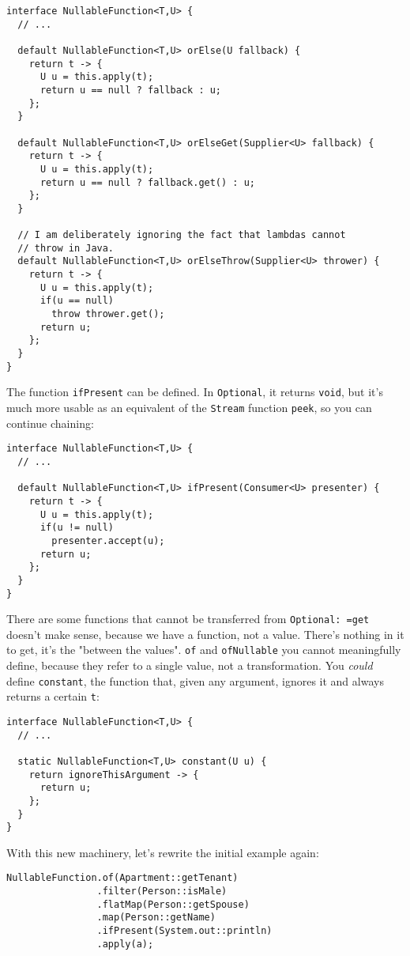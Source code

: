 \documentclass[11pt]{article}
\begin{document}
\begin{verbatim}
interface NullableFunction<T,U> {
  // ...

  default NullableFunction<T,U> orElse(U fallback) {
    return t -> {
      U u = this.apply(t);
      return u == null ? fallback : u;
    };
  }

  default NullableFunction<T,U> orElseGet(Supplier<U> fallback) {
    return t -> {
      U u = this.apply(t);
      return u == null ? fallback.get() : u;
    };
  }

  // I am deliberately ignoring the fact that lambdas cannot 
  // throw in Java.
  default NullableFunction<T,U> orElseThrow(Supplier<U> thrower) {
    return t -> {
      U u = this.apply(t);
      if(u == null)
        throw thrower.get();
      return u;
    };
  }
}
\end{verbatim}

The function \texttt{ifPresent} can be defined. In \texttt{Optional}, it returns \texttt{void}, but it's much more usable as an equivalent of the \texttt{Stream} function \texttt{peek}, so you can continue chaining:

\begin{verbatim}
interface NullableFunction<T,U> {
  // ...

  default NullableFunction<T,U> ifPresent(Consumer<U> presenter) {
    return t -> {
      U u = this.apply(t);
      if(u != null)
        presenter.accept(u);
      return u;
    };
  }
}
\end{verbatim}

There are some functions that cannot be transferred from \texttt{Optional: =get} doesn't make sense, because we have a function, not a value. There's nothing in it to get, it's the "between the values". \texttt{of} and \texttt{ofNullable} you cannot meaningfully define, because they refer to a single value, not a transformation. You \emph{could} define \texttt{constant}, the function that, given any argument, ignores it and always returns a certain \texttt{t}:

\begin{verbatim}
interface NullableFunction<T,U> {
  // ...

  static NullableFunction<T,U> constant(U u) {
    return ignoreThisArgument -> {
      return u;
    };
  }
}
\end{verbatim}

With this new machinery, let's rewrite the initial example again:

\begin{verbatim}
NullableFunction.of(Apartment::getTenant)
                .filter(Person::isMale)
                .flatMap(Person::getSpouse)
                .map(Person::getName)
                .ifPresent(System.out::println)
                .apply(a);
\end{verbatim}
\end{document}
